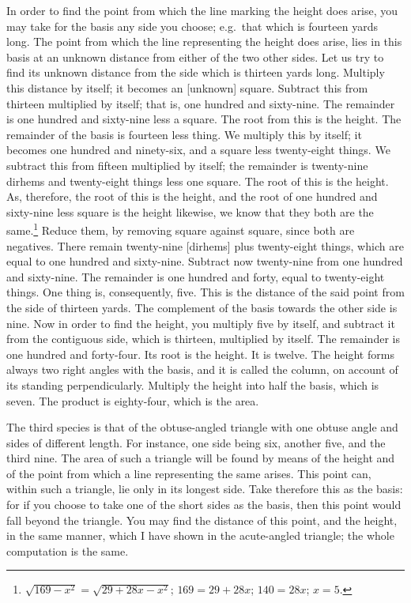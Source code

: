 In order to find the point from which the line marking the height does arise, you may take for the basis any side you choose; e.g.~that which is fourteen yards long. The point from which the line representing the height does arise, lies in this basis at an unknown distance from either of the two other sides. Let us try to find its unknown distance from the side which is thirteen yards long. Multiply this distance by itself; it becomes an [unknown] square. Subtract this from thirteen multiplied by itself; that is, one hundred and sixty-nine. The remainder is one hundred and sixty-nine less a square. The root from this is the height. The remainder of the basis is fourteen less thing. We multiply this by itself; it becomes one hundred and ninety-six, and a square less twenty-eight things. We subtract this from fifteen multiplied by itself; the remainder is twenty-nine dirhems and twenty-eight things less one square. The root of this is the height. As, therefore, the root of this is the height, and the root of one hundred and sixty-nine less square is the height likewise, we know that they both are the same.\footnote{$\sqrt{169 - x^2} = \sqrt{29 + 28x - x^2}$; $169 = 29 + 28x$; $140 = 28x$; $x = 5$.} Reduce them, by removing square against square, since both are negatives. There remain twenty-nine [dirhems] plus twenty-eight things, which are equal to one hundred and sixty-nine. Subtract now twenty-nine from one hundred and sixty-nine. The remainder is one hundred and forty, equal to twenty-eight things. One thing is, consequently, five. This is the distance of the said point from the side of thirteen yards. The complement of the basis towards the other side is nine. Now in order to find the height, you multiply five by itself, and subtract it from the contiguous side, which is thirteen, multiplied by itself. The remainder is one hundred and forty-four. Its root is the height. It is twelve. The height forms always two right angles with the basis, and it is called the column, on account of its standing perpendicularly. Multiply the height into half the basis, which is seven. The product is eighty-four, which is the area.

The third species is that of the obtuse-angled triangle with one obtuse angle and sides of different length. For instance, one side being six, another five, and the third nine. The area of such a triangle will be found by means of the height and of the point from which a line representing the same arises. This point can, within such a triangle, lie only in its longest side. Take therefore this as the basis: for if you choose to take one of the short sides as the basis, then this point would fall beyond the triangle. You may find the distance of this point, and the height, in the same manner, which I have shown in the acute-angled triangle; the whole computation is the same.


